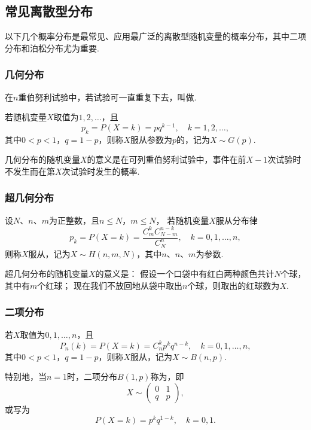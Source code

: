 \subsection{常见离散型分布}

以下几个概率分布是最常见、应用最广泛的离散型随机变量的概率分布，其中二项分布和泊松分布尤为重要.

\subsubsection{几何分布}
\begin{definition}
在\(n\)重伯努利试验中，若试验可一直重复下去，叫做.
\end{definition}

\begin{definition}
若随机变量\(X\)取值为\(1,2,\dotsc\)，且\begin{equation}
p_k = P(X=k) = p q^{k-1}, \quad k=1,2,\dotsc,
\end{equation}其中\(0 < p < 1\)，\(q = 1-p\)，则称\(X\)服从参数为\(p\)的，记为\(X \sim G(p)\).
\end{definition}

几何分布的随机变量\(X\)的意义是在可列重伯努利试验中，事件在前\(X-1\)次试验时不发生而在第\(X\)次试验时发生的概率.

\subsubsection{超几何分布}
\begin{definition}
设\(N\)、\(n\)、\(m\)为正整数，且\(n \leqslant N\)，\(m \leqslant N\)，%
若随机变量\(X\)服从分布律\begin{equation}
p_k = P(X=k) = \frac{C_m^k C_{N-m}^{n-k}}{C_N^n}, \quad k=0,1,\dotsc,n,
\end{equation}则称\(X\)服从，记为\(X \sim H(n,m,N)\)，其中\(n\)、\(n\)、\(m\)为参数.
\end{definition}

超几何分布的随机变量\(X\)的意义是：
假设一个口袋中有红白两种颜色共计\(N\)个球，其中有\(m\)个红球；
现在我们不放回地从袋中取出\(n\)个球，则取出的红球数为\(X\).

\subsubsection{二项分布}
\begin{definition}
若\(X\)取值为\(0,1,\dotsc,n\)，且\begin{equation}
P_n(k) = P(X=k) = C_n^k p^k q^{n-k}, \quad k=0,1,\dotsc,n,
\end{equation}其中\(0 < p < 1\)，\(q = 1-p\)，则称\(X\)服从，记为\(X \sim B(n,p)\).

特别地，当\(n = 1\)时，二项分布\(B(1,p)\)称为，即\[
X \sim \begin{pmatrix} 0 & 1 \\ q & p \end{pmatrix},
\]或写为\[
P(X=k) = p^k q^{1-k}, \quad k=0,1.
\]
\end{definition}

